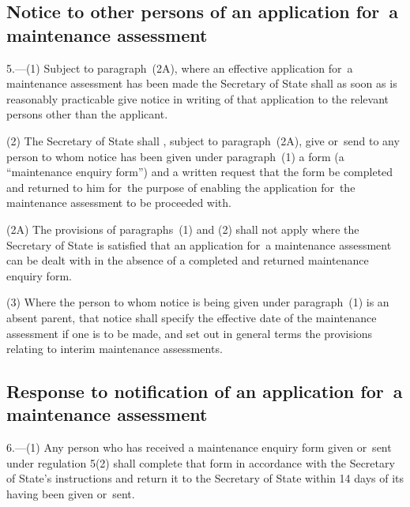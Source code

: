 \documentclass[a4paper,12pt]{article}
\begin{document}
\subsection[5. Notice to other persons of an application for~a maintenance assessment]{Notice to other persons of an application for~a maintenance assessment}

5.—(1) 
Subject to paragraph~(2A), where %
an effective application for~a maintenance assessment has been made the Secretary of State shall as soon as is reasonably practicable give notice in writing of that application to the relevant persons other than the applicant.

(2) The Secretary of State shall%
, subject to paragraph~(2A), %
 give or~send to any person to whom notice has been given under paragraph~(1) a form (a “maintenance enquiry form”) and a written request that the form be completed and returned to him for~the purpose of enabling the application for~the maintenance assessment to be proceeded with.

(2A) The provisions of paragraphs~(1) and (2) shall not apply where the Secretary of State is satisfied that an application for~a maintenance assessment can be dealt with in the absence of a completed and returned maintenance enquiry form. %

(3) Where the person to whom notice is being given under paragraph~(1) is an absent parent, that notice shall specify the effective date of the maintenance assessment if one is to be made, and set out in general terms the provisions relating to interim maintenance assessments.


\subsection[6. Response to notification of an application for~a maintenance assessment]{\sloppy Response to notification of an application for~a maintenance assessment}

6.—(1) Any person who has received a maintenance enquiry form given or~sent under regulation 5(2) shall complete that form in accordance with the Secretary of State’s instructions and return it to the Secretary of State within 14 days of its having been given or~sent.
\end{document}
